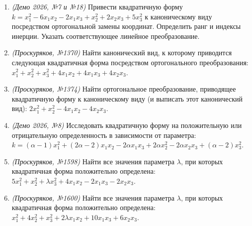 \begin{enumerate}
    \item \textit{(Демо 2026, №7 и №18)} Привести квадратичную форму 
    $k = x_1^2 - 6x_1x_2 - 2x_1x_3 + x_2^2 + 2x_2x_3 + 5x_3^2$ 
    к каноническому виду посредством ортогональной замены координат. Определить ранг и индексы инерции. Указать соответствующее линейное преобразование.

    \item \textit{(Проскуряков, №1370)} Найти канонический вид, к которому приводится следующая квадратичная форма посредством ортогонального преобразования: 
    $x_1^2 + x_2^2 + x_3^2 + 4x_1 x_2 + 4x_1 x_3 + 4x_2 x_3$.

    \item \textit{(Проскуряков, №1374)} Найти ортогональное преобразование, приводящее квадратичную форму к каноническому виду (и выписать этот канонический вид): 
    $2x_1^2 + x_2^2 - 4x_1 x_2 - 4x_2 x_3$.

    \item \textit{(Демо 2026, №8)} Исследовать квадратичную форму на положительную или отрицательную определенность в зависимости от параметра: 
    $k = (\alpha - 1)x_1^2 + (2\alpha - 2)x_1x_2 - 2\alpha x_1x_3 + 2\alpha x_2^2 - 2\alpha x_2x_3 + (\alpha - 2)x_3^2$.

    \item \textit{(Проскуряков, №1598)} Найти все значения параметра $\lambda$, при которых квадратичная форма положительно определена: 
    $5x_1^2 + x_2^2 + \lambda x_3^2 + 4x_1 x_2 - 2x_1 x_3 - 2x_2 x_3$.

    \item \textit{(Проскуряков, №1600)} Найти все значения параметра $\lambda$, при которых квадратичная форма положительно определена: 
    $x_1^2 + 4x_2^2 + x_3^2 + 2\lambda x_1 x_2 + 10x_1 x_3 + 6x_2 x_3$.
\end{enumerate}
